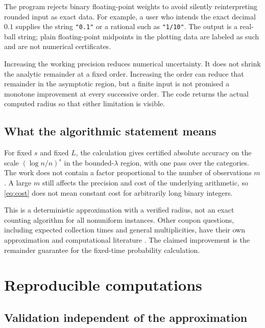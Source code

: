 \documentclass[11pt,a4paper]{article}
\theoremstyle{definition}
\begin{document}
The program rejects binary floating-point weights to avoid silently
reinterpreting rounded input as exact data. For example, a user who
intends the exact decimal $0.1$ supplies the string \texttt{"0.1"} or a
rational such as \texttt{"1/10"}. The output is a real-ball string;
plain floating-point midpoints in the plotting data are labeled as such
and are not numerical certificates.

Increasing the working precision reduces numerical uncertainty. It does
not shrink the analytic remainder at a fixed order. Increasing the
order can reduce that remainder in the asymptotic region, but a finite
input is not promised a monotone improvement at every successive order.
The code returns the actual computed radius so that either limitation
is visible.

\subsection{What the algorithmic statement means}

For fixed $s$ and fixed $L$, the calculation gives certified absolute
accuracy on the scale $(\log n/n)^s$ in the bounded-$\lambda$ region,
with one pass over the categories. The work does not contain a factor
proportional to the number of observations $m$. A large $m$ still affects
the precision and cost of the underlying arithmetic, so \eqref{eq:cost}
does not mean constant cost for arbitrarily long binary integers.

This is a deterministic approximation with a verified radius, not an
exact counting algorithm for all nonuniform instances. Other coupon
questions, including expected collection times and general multiplicities,
have their own approximation and computational literature
\cite{BonehHofri1997,DoumasPapanicolaou2016}. The claimed improvement is
the remainder guarantee for the fixed-time probability calculation.

\section{Reproducible computations}\label{sec:experiments}

\subsection{Validation independent of the approximation}
\end{document}
